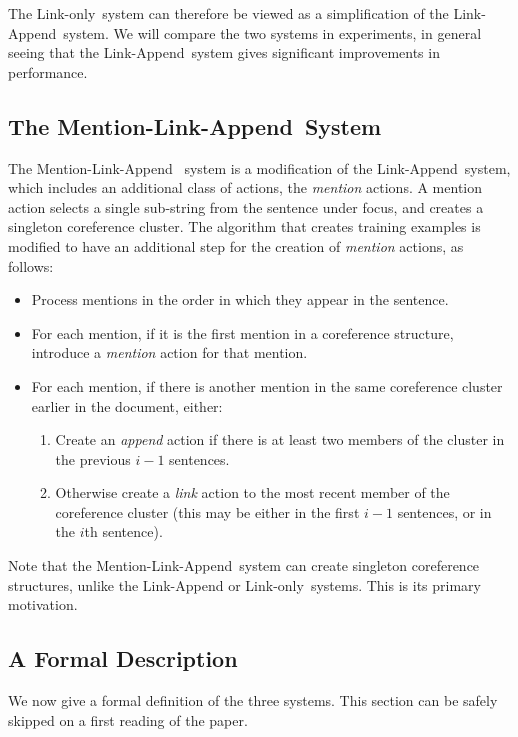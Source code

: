 \documentclass[11pt,a4paper]{article}
\newcommand{\LA}{Link-Append}
\newcommand{\M}{Mention-Link-Append}
\newcommand{\LO}{Link-only}
\begin{document}
The \LO~system can therefore be viewed as a simplification of the \LA~system. We will compare the two systems in experiments, in general seeing that the \LA~system gives significant improvements in performance.

\subsection{The \M~System}

The \M~ system is a modification of the \LA~system, which includes an additional class of actions, the {\em mention} actions. A mention action selects a single sub-string from the sentence under focus, and creates a singleton coreference cluster. The algorithm that creates training examples is modified to have an additional step for the creation of {\em mention} actions, as follows: 

\begin{itemize}
    \item Process mentions in the order in which they appear in the sentence. 
    
    \item For each mention, if it is the first mention in a coreference structure, introduce a {\em mention} action for that mention.
    
    \item For each mention, if there is another mention in the same coreference cluster earlier in the document, either:
    
    \begin{enumerate}
        \item Create an {\em append} action if there is at least two members of the cluster in the previous $i-1$ sentences.
        \item Otherwise create a {\em link} action to the most recent member of the coreference cluster (this may be either in the first $i-1$ sentences, or in the $i$th sentence).
    \end{enumerate}
    
\end{itemize}
Note that the \M~system can create singleton coreference structures, unlike the {\sc Link-Append} or \LO~systems. This is its primary motivation.

\subsection{A Formal Description}

We now give a formal definition of the three systems. This section can be safely skipped on a first reading of the paper.
\end{document}
